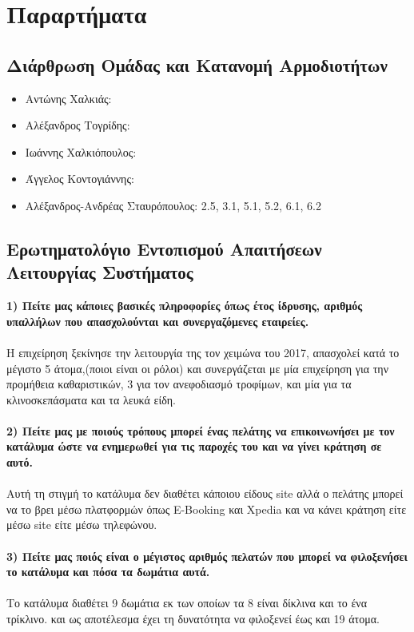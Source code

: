 \chapter{Παραρτήματα}
		
\section{Διάρθρωση Ομάδας και Κατανομή Αρμοδιοτήτων}
\begin{itemize}
	\item Αντώνης Χαλκιάς:
	\item Αλέξανδρος Τογρίδης: 
	\item Ιωάννης Χαλκιόπουλος:
	\item Άγγελος Κοντογιάννης: 
	\item Αλέξανδρος-Ανδρέας Σταυρόπουλος: 2.5, 3.1, 5.1, 5.2, 6.1,  6.2
\end{itemize}

\section{Ερωτηματολόγιο Εντοπισμού Απαιτήσεων Λειτουργίας Συστήματος}
\textbf{1) Πείτε μας κάποιες βασικές πληροφορίες όπως έτος ίδρυσης, αριθμός 
	υπαλλήλων που απασχολούνται και συνεργαζόμενες εταιρείες.} \\ \\
\noindent
Η επιχείρηση ξεκίνησε την λειτουργία της τον χειμώνα του 2017, απασχολεί κατά 
το μέγιστο 5 άτομα,(ποιοι είναι οι ρόλοι) και συνεργάζεται με μία επιχείρηση
για την προμήθεια καθαριστικών, 3 για τον ανεφοδιασμό τροφίμων, και μία για 
τα κλινοσκεπάσματα και τα λευκά είδη. \\ \\

\noindent
\textbf{2) Πείτε μας με ποιούς τρόπους μπορεί ένας πελάτης να επικοινωνήσει
	με τον κατάλυμα ώστε να ενημερωθεί για τις παροχές του και να γίνει κράτηση
	σε αυτό.} \\ \\
\noindent
Αυτή τη στιγμή το κατάλυμα δεν διαθέτει κάποιου είδους site αλλά ο πελάτης
μπορεί να το βρει μέσω πλατφορμών όπως 	E-Booking και Xpedia και να κάνει
κράτηση είτε μέσω site είτε μέσω τηλεφώνου. \\ \\ 
  
\noindent
\textbf{3) Πείτε μας ποιός είναι ο μέγιστος αριθμός πελατών που μπορεί να φιλοξενήσει 
	το κατάλυμα και πόσα τα δωμάτια αυτά.} \\ \\
\noindent
Το κατάλυμα διαθέτει 9 δωμάτια εκ των οποίων τα 8 είναι δίκλινα και το ένα τρίκλινο.
και ως αποτέλεσμα έχει τη δυνατότητα να φιλοξενεί έως και 19 άτομα.\\ \\

